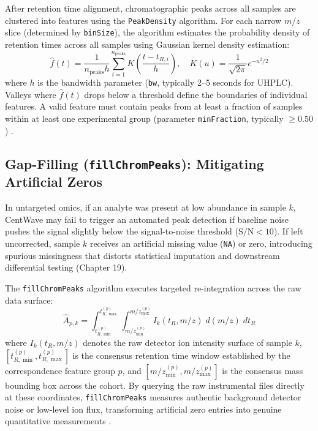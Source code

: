 \documentclass[11pt,twoside,openright]{book}
\begin{document}
After retention time alignment, chromatographic peaks across all samples are clustered into features using the \texttt{PeakDensity} algorithm. For each narrow $m/z$ slice (determined by \texttt{binSize}), the algorithm estimates the probability density of retention times across all samples using Gaussian kernel density estimation:
\begin{equation}
\label{eq:kde_rt}
\hat{f}(t) = \frac{1}{n_{\text{peaks}} h} \sum_{i=1}^{n_{\text{peaks}}} K\left( \frac{t - t_{R, i}}{h} \right), \quad K(u) = \frac{1}{\sqrt{2\pi}} e^{-u^2/2}
\end{equation}
where $h$ is the bandwidth parameter (\texttt{bw}, typically 2--5 seconds for UHPLC). Valleys where $\hat{f}(t)$ drops below a threshold define the boundaries of individual features. A valid feature must contain peaks from at least a fraction of samples within at least one experimental group (parameter \texttt{minFraction}, typically $\ge 0.50$) \cite{mclean2021metabolomics}.

\subsection{Gap-Filling (\texttt{fillChromPeaks}): Mitigating Artificial Zeros}

In untargeted omics, if an analyte was present at low abundance in sample $k$, CentWave may fail to trigger an automated peak detection if baseline noise pushes the signal slightly below the signal-to-noise threshold ($\text{S/N} < 10$). If left uncorrected, sample $k$ receives an artificial missing value (\texttt{NA}) or zero, introducing spurious missingness that distorts statistical imputation and downstream differential testing (Chapter 19).

The \texttt{fillChromPeaks} algorithm executes targeted re-integration across the raw data surface:
\begin{equation}
\label{eq:gap_fill}
\hat{A}_{p, k} = \int_{t_{R, \min}^{(p)}}^{t_{R, \max}^{(p)}} \int_{m/z_{\min}^{(p)}}^{m/z_{\max}^{(p)}} I_k(t_R, m/z) \; d(m/z) \; dt_R
\end{equation}
where $I_k(t_R, m/z)$ denotes the raw detector ion intensity surface of sample $k$, $[t_{R, \min}^{(p)}, t_{R, \max}^{(p)}]$ is the consensus retention time window established by the correspondence feature group $p$, and $[m/z_{\min}^{(p)}, m/z_{\max}^{(p)}]$ is the consensus mass bounding box across the cohort. By querying the raw instrumental files directly at these coordinates, \texttt{fillChromPeaks} measures authentic background detector noise or low-level ion flux, transforming artificial zero entries into genuine quantitative measurements \cite{benton2015evaluating, gieling2020assessment}.
\end{document}
